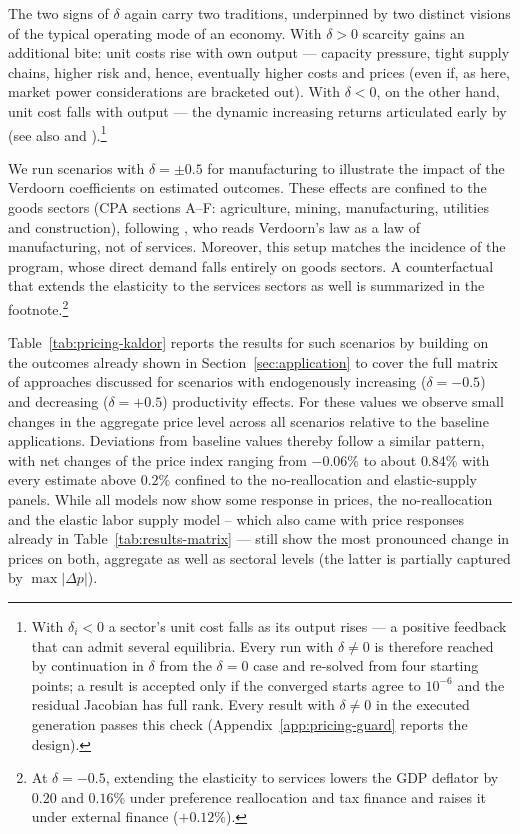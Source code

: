 The two signs of $\delta$ again carry two traditions, underpinned by two distinct visions of the typical operating mode of an economy. With $\delta > 0$ scarcity gains an additional bite: unit costs rise with own output --- capacity pressure, tight supply chains, higher risk and, hence, eventually higher costs and prices (even if, as here, market power considerations are bracketed out). With $\delta < 0$, on the other hand, unit cost falls with output --- the dynamic increasing returns articulated early by \textcite{Verdoorn1949} (see also \citealp{Kaldor1966} and \citealp{SylosLabini1995}).\footnote{With $\delta_i < 0$ a sector's unit cost falls as its output rises --- a positive feedback that can admit several equilibria. Every run with $\delta \neq 0$ is therefore reached by continuation in $\delta$ from the $\delta = 0$ case and re-solved from four starting points; a result is accepted only if the converged starts agree to $10^{-6}$ and the residual Jacobian has full rank. Every result with $\delta \neq 0$ in the executed generation passes this check (Appendix~\ref{app:pricing-guard} reports the design).}

We run scenarios with $\delta = \pm 0.5$ for manufacturing to illustrate the impact of the Verdoorn coefficients on estimated outcomes. These effects are confined to the
goods sectors (CPA sections A--F: agriculture, mining, manufacturing, utilities
and construction), following \textcite{Kaldor1966}, who reads Verdoorn's law
as a law of manufacturing, not of services. Moreover, this setup matches the incidence of the program, whose direct demand falls entirely on goods sectors. A counterfactual that extends the elasticity to the services sectors as well is summarized in the footnote.\footnote{At $\delta=-0.5$, extending the elasticity to services lowers the GDP deflator by $0.20$ and $0.16\%$ under preference reallocation and tax finance and raises it under external finance ($+0.12\%$).}

Table~\ref{tab:pricing-kaldor} reports the results for such scenarios by building on the outcomes already shown in Section~\ref{sec:application} to cover the full matrix of approaches discussed for scenarios with endogenously increasing ($\delta = -0.5$) and decreasing ($\delta = +0.5$) productivity effects. For these values we observe small changes in the aggregate price level across all scenarios relative to the baseline applications. Deviations from baseline values thereby follow a similar pattern, with net changes of the price index ranging from $-0.06\%$ to about $0.84\%$ with every estimate above $0.2\%$ confined to the no-reallocation and elastic-supply panels. While all models now show some response in prices, the no-reallocation and the elastic labor supply model -- which also came with price responses already in Table~\ref{tab:results-matrix} --- still show the most pronounced change in prices on both, aggregate as well as sectoral levels (the latter is partially captured by $\max |\Delta p|$).


